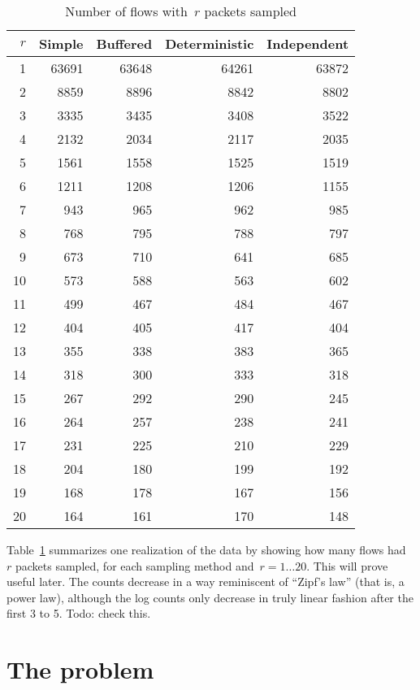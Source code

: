 \documentclass{paper}
\begin{document}
\begin{table}
\begin{center}
\begin{tabular}{r r r r r}
$r$ & Simple & Buffered & Deterministic & Independent \\
\midrule
1 & 63691 & 63648 & 64261 & 63872 \\
2 & 8859 & 8896 & 8842 & 8802 \\
3 & 3335 & 3435 & 3408 & 3522 \\
4 & 2132 & 2034 & 2117 & 2035 \\
5 & 1561 & 1558 & 1525 & 1519 \\
6 & 1211 & 1208 & 1206 & 1155 \\
7 & 943 & 965 & 962 & 985 \\
8 & 768 & 795 & 788 & 797 \\
9 & 673 & 710 & 641 & 685 \\
10 & 573 & 588 & 563 & 602 \\
11 & 499 & 467 & 484 & 467 \\
12 & 404 & 405 & 417 & 404 \\
13 & 355 & 338 & 383 & 365 \\
14 & 318 & 300 & 333 & 318 \\
15 & 267 & 292 & 290 & 245 \\
16 & 264 & 257 & 238 & 241 \\
17 & 231 & 225 & 210 & 229 \\
18 & 204 & 180 & 199 & 192 \\
19 & 168 & 178 & 167 & 156 \\
20 & 164 & 161 & 170 & 148 \\
\end{tabular}
\caption{Number of flows with~$r$ packets sampled}
\label{flows_with_r}
\end{center}
\end{table}

Table~\ref{flows_with_r} summarizes one realization of the data by showing how
many flows had~$r$ packets sampled, for each sampling method and~$r = 1 \dots
20$. This will prove useful later. The counts decrease in a way reminiscent of
``Zipf's law'' (that is, a power law), although the log counts only decrease in
truly linear fashion after the first 3 to 5. Todo: check this.

\section{The problem}
\end{document}
